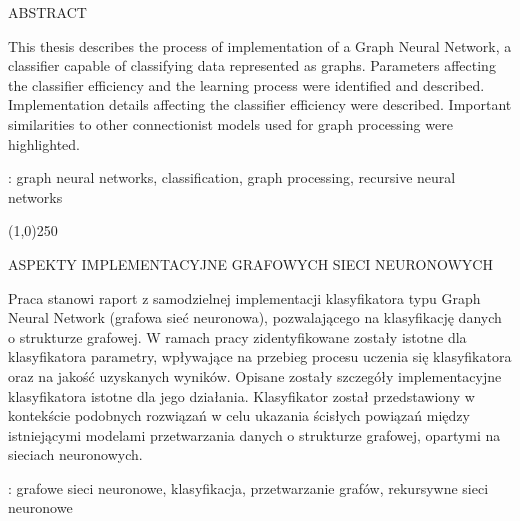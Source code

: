 \begin{titlepage}
	\cleardoublepage

    \newpage\thispagestyle{empty}
    \vspace*{2\baselineskip}
    \begin{center}
	{\MakeUppercase{Abstract}}\par\bigskip
    \end{center}

    {\noindent
	This thesis describes the process of implementation of a Graph Neural Network, a classifier capable of classifying data represented as graphs. Parameters affecting the classifier efficiency and the learning process were identified and described. Implementation details affecting the classifier efficiency were described. Important similarities to other connectionist models used for graph processing were highlighted.
	}
    \vspace*{1\baselineskip}

    : {graph neural networks, classification, graph processing, recursive neural networks}
    \par
    \vspace{5\baselineskip}

	\begin{center}
	\line(1,0){250}
	\end{center}

    \begin{center}
	{\MakeUppercase{ASPEKTY IMPLEMENTACYJNE GRAFOWYCH SIECI NEURONOWYCH}}\par\bigskip
    \end{center}
    {\noindent
	Praca stanowi raport z samodzielnej implementacji klasyfikatora typu Graph Neural Network (grafowa sieć neuronowa), pozwalającego na klasyfikację danych o strukturze grafowej. W ramach pracy zidentyfikowane zostały istotne dla klasyfikatora parametry, wpływające na przebieg procesu uczenia się klasyfikatora oraz na jakość uzyskanych wyników. Opisane zostały szczegóły implementacyjne klasyfikatora istotne dla jego działania. Klasyfikator został przedstawiony w kontekście podobnych rozwiązań w celu ukazania ścisłych powiązań między istniejącymi modelami przetwarzania danych o strukturze grafowej, opartymi na sieciach neuronowych.
	}
	
    \vspace*{1\baselineskip}

    : {grafowe sieci neuronowe, klasyfikacja, przetwarzanie grafów, rekursywne sieci neuronowe}

	\cleardoublepage

\end{titlepage}

